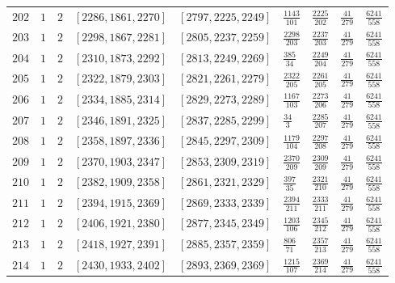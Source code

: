 \documentclass[12pt]{extarticle}
\begin{document}
\begin{longtable}{lllllllll}
$202$ & $1$ & $2$ & $\left[2286, 1861, 2270\right]$ & $\left[2797, 2225, 2249\right]$ & $\frac{1143}{101}$ & $\frac{2225}{202}$ & $\frac{41}{279}$ & $\frac{6241}{558}$ \\
$203$ & $1$ & $2$ & $\left[2298, 1867, 2281\right]$ & $\left[2805, 2237, 2259\right]$ & $\frac{2298}{203}$ & $\frac{2237}{203}$ & $\frac{41}{279}$ & $\frac{6241}{558}$ \\
$204$ & $1$ & $2$ & $\left[2310, 1873, 2292\right]$ & $\left[2813, 2249, 2269\right]$ & $\frac{385}{34}$ & $\frac{2249}{204}$ & $\frac{41}{279}$ & $\frac{6241}{558}$ \\
$205$ & $1$ & $2$ & $\left[2322, 1879, 2303\right]$ & $\left[2821, 2261, 2279\right]$ & $\frac{2322}{205}$ & $\frac{2261}{205}$ & $\frac{41}{279}$ & $\frac{6241}{558}$ \\
$206$ & $1$ & $2$ & $\left[2334, 1885, 2314\right]$ & $\left[2829, 2273, 2289\right]$ & $\frac{1167}{103}$ & $\frac{2273}{206}$ & $\frac{41}{279}$ & $\frac{6241}{558}$ \\
$207$ & $1$ & $2$ & $\left[2346, 1891, 2325\right]$ & $\left[2837, 2285, 2299\right]$ & $\frac{34}{3}$ & $\frac{2285}{207}$ & $\frac{41}{279}$ & $\frac{6241}{558}$ \\
$208$ & $1$ & $2$ & $\left[2358, 1897, 2336\right]$ & $\left[2845, 2297, 2309\right]$ & $\frac{1179}{104}$ & $\frac{2297}{208}$ & $\frac{41}{279}$ & $\frac{6241}{558}$ \\
$209$ & $1$ & $2$ & $\left[2370, 1903, 2347\right]$ & $\left[2853, 2309, 2319\right]$ & $\frac{2370}{209}$ & $\frac{2309}{209}$ & $\frac{41}{279}$ & $\frac{6241}{558}$ \\
$210$ & $1$ & $2$ & $\left[2382, 1909, 2358\right]$ & $\left[2861, 2321, 2329\right]$ & $\frac{397}{35}$ & $\frac{2321}{210}$ & $\frac{41}{279}$ & $\frac{6241}{558}$ \\
$211$ & $1$ & $2$ & $\left[2394, 1915, 2369\right]$ & $\left[2869, 2333, 2339\right]$ & $\frac{2394}{211}$ & $\frac{2333}{211}$ & $\frac{41}{279}$ & $\frac{6241}{558}$ \\
$212$ & $1$ & $2$ & $\left[2406, 1921, 2380\right]$ & $\left[2877, 2345, 2349\right]$ & $\frac{1203}{106}$ & $\frac{2345}{212}$ & $\frac{41}{279}$ & $\frac{6241}{558}$ \\
$213$ & $1$ & $2$ & $\left[2418, 1927, 2391\right]$ & $\left[2885, 2357, 2359\right]$ & $\frac{806}{71}$ & $\frac{2357}{213}$ & $\frac{41}{279}$ & $\frac{6241}{558}$ \\
$214$ & $1$ & $2$ & $\left[2430, 1933, 2402\right]$ & $\left[2893, 2369, 2369\right]$ & $\frac{1215}{107}$ & $\frac{2369}{214}$ & $\frac{41}{279}$ & $\frac{6241}{558}$ \\

\end{longtable}
\end{document}
